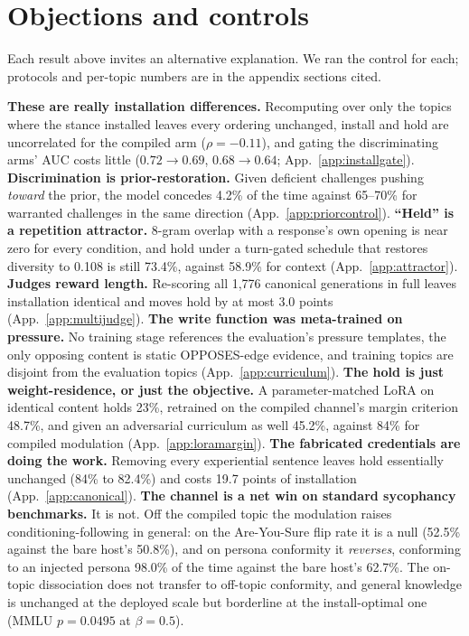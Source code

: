 \section{Objections and controls}
\label{sec:objections}

Each result above invites an alternative explanation. We ran the control for each; protocols
and per-topic numbers are in the appendix sections cited.

\textbf{These are really installation differences.} Recomputing over only the topics where
the stance installed leaves every ordering unchanged, install and hold are uncorrelated for the
compiled arm (\(\rho=-0.11\)), and gating the discriminating arms' AUC costs little
(\(0.72\to0.69\), \(0.68\to0.64\); App.~\ref{app:installgate}).
\textbf{Discrimination is prior-restoration.} Given deficient challenges pushing \emph{toward}
the prior, the model concedes 4.2\% of the time against 65--70\% for warranted challenges in
the same direction (App.~\ref{app:priorcontrol}). \textbf{``Held'' is a repetition attractor.}
8-gram overlap with a response's own opening is near zero for every condition, and hold under a
turn-gated schedule that restores diversity to 0.108 is still 73.4\%, against 58.9\% for
context (App.~\ref{app:attractor}). \textbf{Judges reward length.} Re-scoring all 1{,}776 canonical generations in full leaves
installation identical and moves hold by at most 3.0 points (App.~\ref{app:multijudge}). \textbf{The write function was meta-trained on pressure.} No training stage references the
evaluation's pressure templates, the only opposing content is static OPPOSES-edge evidence, and
training topics are disjoint from the evaluation topics (App.~\ref{app:curriculum}). \textbf{The hold is just weight-residence, or just the objective.}
A parameter-matched LoRA on identical content holds 23\%, retrained on the compiled channel's
margin criterion 48.7\%, and given an adversarial curriculum as well 45.2\%, against 84\% for
compiled modulation (App.~\ref{app:loramargin}). \textbf{The fabricated credentials are doing the work.} Removing every experiential sentence
leaves hold essentially unchanged (84\% to 82.4\%) and costs 19.7 points of installation
(App.~\ref{app:canonical}). \textbf{The channel is a net win on standard sycophancy benchmarks.} It is not. Off the
compiled topic the modulation raises conditioning-following in general: on the Are-You-Sure
flip rate it is a null (52.5\% against the bare host's 50.8\%), and on persona conformity
\citep{perez2022persona} it \emph{reverses}, conforming to an injected persona 98.0\% of the
time against the bare host's 62.7\%. The on-topic dissociation does not transfer to
off-topic conformity, and general knowledge is unchanged at the deployed scale but borderline
at the install-optimal one (MMLU \(p=0.0495\) at \(\beta=0.5\)).

